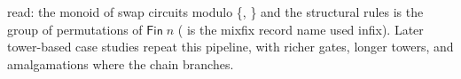 \begin{code}%
\>[0]\AgdaSpace{}%
\AgdaSymbol{:}\AgdaSpace{}%
\AgdaSpace{}%
\AgdaSpace{}%
\AgdaSpace{}%
\AgdaSymbol{(}\AgdaSpace{}%
\AgdaSymbol{)}\AgdaSpace{}%
\AgdaSpace{}%
\AgdaSymbol{(}\AgdaSpace{}%
\AgdaSymbol{)}\<%
\end{code}
\begin{code}[hide]%
\>[0]\AgdaSpace{}%
\AgdaSpace{}%
\AgdaSymbol{=}\AgdaSpace{}%
\AgdaSpace{}%
\<%
\end{code}

\noindent read: the monoid of swap circuits modulo \{,
\} and the structural rules is the group of
permutations of $\mathsf{Fin}\;n$ ( is the mixfix
record name  used infix).  Later tower-based
case studies repeat this pipeline, with richer gates, longer towers,
and amalgamations where the chain branches.
